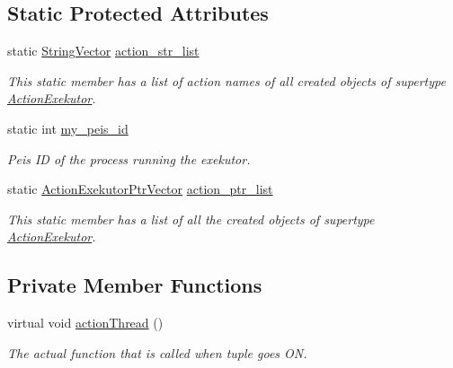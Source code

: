 \subsection*{\-Static \-Protected \-Attributes}
\begin{DoxyCompactItemize}
\item 
static \hyperlink{namespaceexekutor_a58d8a9cd227883a8eacb6400c9f62acb}{\-String\-Vector} \hyperlink{classexekutor_1_1ActionExekutor_a0dc39a7a2a3a67d2bdd366f9e6e682a2}{action\-\_\-str\-\_\-list}
\begin{DoxyCompactList}\small\item\em \-This static member has a list of action names of all created objects of supertype \hyperlink{classexekutor_1_1ActionExekutor}{\-Action\-Exekutor}. \end{DoxyCompactList}\item 
static int \hyperlink{classexekutor_1_1ActionExekutor_a31644a88e4d0166c2d3a70bab9eb5b99}{my\-\_\-peis\-\_\-id}
\begin{DoxyCompactList}\small\item\em \-Peis \-I\-D of the process running the exekutor. \end{DoxyCompactList}\item 
static \hyperlink{namespaceexekutor_a141a8f9a739e67ffb2356da18a653162}{\-Action\-Exekutor\-Ptr\-Vector} \hyperlink{classexekutor_1_1ActionExekutor_a73c4f2607b0725f5b201cf501cb42578}{action\-\_\-ptr\-\_\-list}
\begin{DoxyCompactList}\small\item\em \-This static member has a list of all the created objects of supertype \hyperlink{classexekutor_1_1ActionExekutor}{\-Action\-Exekutor}. \end{DoxyCompactList}\end{DoxyCompactItemize}
\subsection*{\-Private \-Member \-Functions}
\begin{DoxyCompactItemize}
\item 
virtual void \hyperlink{classexekutor_1_1FiddleExekutor_a3730a8ac2bbe7be67a18ccd9a0dffbab}{action\-Thread} ()
\begin{DoxyCompactList}\small\item\em \-The actual function that is called when tuple goes \-O\-N. \end{DoxyCompactList}\end{DoxyCompactItemize}
